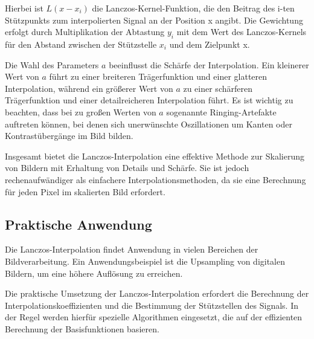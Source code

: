 Hierbei ist $L(x - x_i)$ die Lanczos-Kernel-Funktion, die den Beitrag des i-ten Stützpunkts zum interpolierten Signal an der Position x angibt.
Die Gewichtung erfolgt durch Multiplikation der Abtastung $y_i$ mit dem Wert des Lanczos-Kernels für den Abstand zwischen der Stützstelle $x_i$ und dem Zielpunkt x.

Die Wahl des Parameters $a$ beeinflusst die Schärfe der Interpolation.
Ein kleinerer Wert von $a$ führt zu einer breiteren Trägerfunktion und einer glatteren Interpolation, während ein größerer Wert von $a$ zu einer schärferen Trägerfunktion und einer detailreicheren Interpolation führt.
Es ist wichtig zu beachten, dass bei zu großen Werten von $a$ sogenannte Ringing-Artefakte auftreten können, bei denen sich unerwünschte Oszillationen um Kanten oder Kontrastübergänge im Bild bilden.

Insgesamt bietet die Lanczos-Interpolation eine effektive Methode zur Skalierung von Bildern mit Erhaltung von Details und Schärfe.
Sie ist jedoch rechenaufwändiger als einfachere Interpolationsmethoden, da sie eine Berechnung für jeden Pixel im skalierten Bild erfordert.
~

\subsection{Praktische Anwendung}

Die Lanczos-Interpolation findet Anwendung in vielen Bereichen der Bildverarbeitung. 
Ein Anwendungsbeispiel ist die Upsampling von digitalen Bildern, um eine höhere Auflösung zu erreichen.

Die praktische Umsetzung der Lanczos-Interpolation erfordert die Berechnung der Interpolationskoeffizienten und die Bestimmung der Stützstellen des Signals. 
In der Regel werden hierfür spezielle Algorithmen eingesetzt, die auf der effizienten Berechnung der Basisfunktionen basieren.

